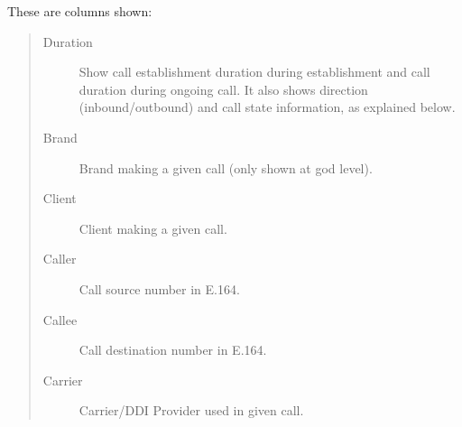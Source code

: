 \documentclass[letterpaper,10pt,spanish]{sphinxmanual}
\begin{document}
These are columns shown:
\begin{quote}
\begin{description}
\item[{Duration}] \leavevmode
Show call establishment duration during establishment and call duration during ongoing call. It also shows
direction (inbound/outbound) and call state information, as explained below.

\item[{Brand}] \leavevmode
Brand making a given call (only shown at god level).

\item[{Client}] \leavevmode
Client making a given call.

\item[{Caller}] \leavevmode
Call source number in E.164.

\item[{Callee}] \leavevmode
Call destination number in E.164.

\item[{Carrier}] \leavevmode
Carrier/DDI Provider used in given call.

\end{description}
\end{quote}
\end{document}
